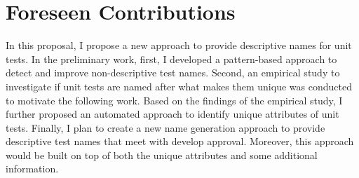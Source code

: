 \section{Foreseen Contributions}
\label{sec:contributions}

In this proposal, I propose a new approach to provide descriptive names for unit tests.
%
In the preliminary work, first, I developed a pattern-based approach to detect and improve non-descriptive test names.
%
Second, an empirical study to investigate if unit tests are named after what makes them unique was conducted to motivate the following work.
%
Based on the findings of the empirical study, I further proposed an automated approach to identify unique attributes of unit tests.
%
Finally, I plan to create a new name generation approach to provide descriptive test names that meet with develop approval.
%
Moreover, this approach would be built on top of both the unique attributes and some additional information.


